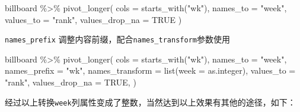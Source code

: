 \documentclass[
]{book}
\newenvironment{Shaded}{\begin{snugshade}}{\end{snugshade}}
\newcommand{\AttributeTok}[1]{\textcolor[rgb]{0.77,0.63,0.00}{#1}}
\newcommand{\ConstantTok}[1]{\textcolor[rgb]{0.00,0.00,0.00}{#1}}
\newcommand{\FunctionTok}[1]{\textcolor[rgb]{0.00,0.00,0.00}{#1}}
\newcommand{\NormalTok}[1]{#1}
\newcommand{\SpecialCharTok}[1]{\textcolor[rgb]{0.00,0.00,0.00}{#1}}
\newcommand{\StringTok}[1]{\textcolor[rgb]{0.31,0.60,0.02}{#1}}
\begin{document}
\begin{Shaded}
\begin{Highlighting}[]
\NormalTok{billboard }\SpecialCharTok{\%\textgreater{}\%} 
  \FunctionTok{pivot\_longer}\NormalTok{(}
    \AttributeTok{cols =} \FunctionTok{starts\_with}\NormalTok{(}\StringTok{"wk"}\NormalTok{), }
    \AttributeTok{names\_to =} \StringTok{"week"}\NormalTok{, }
    \AttributeTok{values\_to =} \StringTok{"rank"}\NormalTok{,}
    \AttributeTok{values\_drop\_na =} \ConstantTok{TRUE}
\NormalTok{  )}
\end{Highlighting}
\end{Shaded}

\texttt{names\_prefix} 调整内容前缀，配合\texttt{names\_transform}参数使用

\begin{Shaded}
\begin{Highlighting}[]
\NormalTok{billboard }\SpecialCharTok{\%\textgreater{}\%} 
  \FunctionTok{pivot\_longer}\NormalTok{(}
    \AttributeTok{cols =} \FunctionTok{starts\_with}\NormalTok{(}\StringTok{"wk"}\NormalTok{), }
    \AttributeTok{names\_to =} \StringTok{"week"}\NormalTok{, }
    \AttributeTok{names\_prefix =} \StringTok{"wk"}\NormalTok{,}
    \AttributeTok{names\_transform =} \FunctionTok{list}\NormalTok{(}\AttributeTok{week =}\NormalTok{ as.integer),}
    \AttributeTok{values\_to =} \StringTok{"rank"}\NormalTok{,}
    \AttributeTok{values\_drop\_na =} \ConstantTok{TRUE}\NormalTok{,}
\NormalTok{  )}
\end{Highlighting}
\end{Shaded}

经过以上转换\texttt{week}列属性变成了整数，当然达到以上效果有其他的途径，如下：
\end{document}
